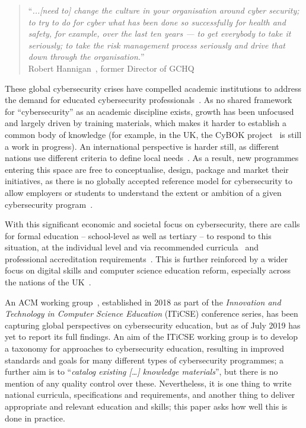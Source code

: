 \documentclass[conference]{IEEEtran}
\begin{document}
\begin{quote}
``{\emph{...[need to] change the culture in your organisation around cyber security; to try to do for cyber what has been done so successfully for health and safety, for example, over the last ten years --- to get everybody to take it seriously; to take the risk management process seriously and drive that down through the organisation.}}''\\
\hfill Robert Hannigan~\cite{Hannigan2019a}, former Director of GCHQ
\end{quote}

These global cybersecurity crises have compelled academic institutions to address the demand for educated cybersecurity professionals~\cite{McGettrick2013}. As no shared framework for ``cybersecurity'' as an academic discipline exists, growth has been unfocused and largely driven by training materials, which makes it harder to establish a common body of knowledge (for example, in the UK, the CyBOK project~\cite{Bristol2019a} is still a work in progress). An international perspective is harder still, as different nations use different criteria to define local needs~\cite{schneider2013}. As a result, new programmes entering this space are free to conceptualise, design, package and market their initiatives, as there is no globally accepted reference model for cybersecurity to allow employers or students to understand the extent or ambition of a given cybersecurity program~\cite{conklin-et-al:2014,Parrishetal2018a}.

With this significant economic and societal focus on cybersecurity, there are calls for formal education -- school-level as well as tertiary -- to respond to this situation, at the individual level and via recommended curricula~\cite{mcgettrick-et-al:sigcse2014,ACM2017b} and professional accreditation requirements~\cite{BCS2018a,NCSC2017}. This is further reinforced by a wider focus on digital skills and computer science education reform, especially across the nations of the UK~\cite{brown-et-al:toce2014,murphy-et-al:programming2017,tryfonas+crick:petra2018}. 

An ACM working group~\cite{Parrishetal2018a}, established in 2018 as part of the {\emph{Innovation and Technology in Computer Science Education}} (ITiCSE) conference series, has been capturing global perspectives on cybersecurity education, but as of July 2019 has yet to report its full findings. An aim of the ITiCSE working group is to develop a taxonomy for approaches to cybersecurity education, resulting in improved standards and goals for many different types of cybersecurity programmes; a further aim is to ``{\emph{catalog existing [\dots] knowledge materials}}'', but there is no mention of any quality control over these. Nevertheless, it is one thing to write national curricula, specifications and requirements, and another thing to deliver appropriate and relevant education and skills; this paper asks how well this is done in practice.
\end{document}
